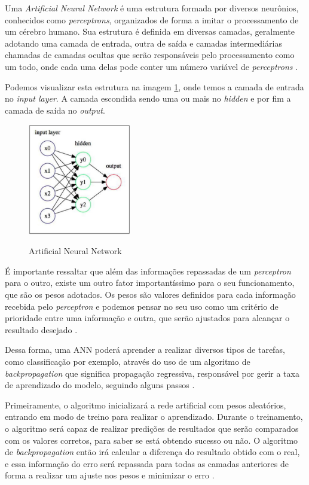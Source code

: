 Uma \emph{Artificial Neural Network} é uma estrutura formada por diversos neurônios, conhecidos como \emph{perceptrons}, organizados de forma a imitar o processamento de um cérebro humano. Sua estrutura é definida em diversas camadas, geralmente adotando uma camada de entrada, outra de saída e camadas intermediárias chamadas de camadas ocultas que serão responsáveis pelo processamento como um todo, onde cada uma delas pode conter um número variável de \emph{perceptrons} \cite{deepLearningTensorFlow}.

Podemos visualizar esta estrutura na imagem \ref{fig:neuralNetwork}, onde temos a camada de entrada no \emph{input layer}. A camada escondida sendo uma ou mais no \emph{hidden} e por fim a camada de saída no \emph{output}.

\begin{figure}[!htb]
	\centering
	\caption{Artificial Neural Network}
	\includegraphics[width=0.40\textwidth]{img/neuralNetwork.jpg}
	\label{fig:neuralNetwork}
\end{figure}

É importante ressaltar que além das informações repassadas de um \emph{perceptron} para o outro, existe um outro fator importantíssimo para o seu funcionamento, que são os pesos adotados. Os pesos são valores definidos para cada informação recebida pelo \emph{perceptron} e podemos pensar no seu uso como um critério de prioridade entre uma informação e outra, que serão ajustados para alcançar o resultado desejado \cite{deepLearningTensorFlow}.

Dessa forma, uma ANN poderá aprender a realizar diversos tipos de tarefas, como classificação por exemplo, através do uso de um algoritmo de \emph{backpropagation} que significa propagação regressiva, responsável por gerir a taxa de aprendizado do modelo, seguindo alguns passos \cite{deepLearningTensorFlow}.

Primeiramente, o algoritmo inicializará a rede artificial com pesos aleatórios, entrando em modo de treino para realizar o aprendizado. Durante o treinamento, o algoritmo será capaz de realizar predições de resultados que serão comparados com os valores corretos, para saber se está obtendo sucesso ou não. O algoritmo de \emph{backpropagation} então irá calcular a diferença do resultado obtido com o real, e essa informação do erro será repassada para todas as camadas anteriores de forma a realizar um ajuste nos pesos e minimizar o erro \cite{deepLearningTensorFlow}.

